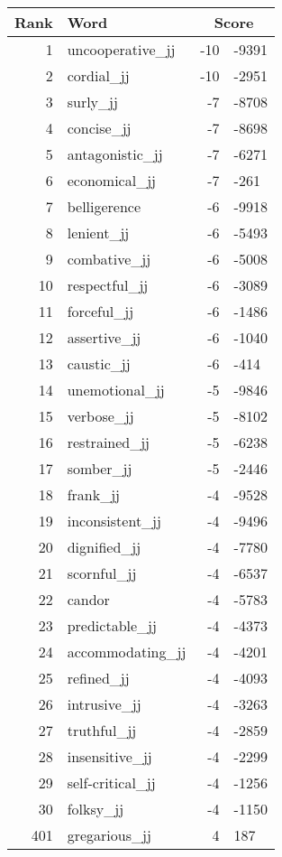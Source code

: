 \begin{longtable}[!htbp]{| rlr@{.}l |}
    \hline
    \textbf{Rank} & \textbf{Word} & \multicolumn{2}{c|}{\textbf{Score}} \\
    \hline
    \endhead
    1 & uncooperative\_jj & -10 & -9391 \\
    2 & cordial\_jj & -10 & -2951 \\
    3 & surly\_jj & -7 & -8708 \\
    4 & concise\_jj & -7 & -8698 \\
    5 & antagonistic\_jj & -7 & -6271 \\
    6 & economical\_jj & -7 & -261 \\
    7 & belligerence & -6 & -9918 \\
    8 & lenient\_jj & -6 & -5493 \\
    9 & combative\_jj & -6 & -5008 \\
    10 & respectful\_jj & -6 & -3089 \\
    11 & forceful\_jj & -6 & -1486 \\
    12 & assertive\_jj & -6 & -1040 \\
    13 & caustic\_jj & -6 & -414 \\
    14 & unemotional\_jj & -5 & -9846 \\
    15 & verbose\_jj & -5 & -8102 \\
    16 & restrained\_jj & -5 & -6238 \\
    17 & somber\_jj & -5 & -2446 \\
    18 & frank\_jj & -4 & -9528 \\
    19 & inconsistent\_jj & -4 & -9496 \\
    20 & dignified\_jj & -4 & -7780 \\
    21 & scornful\_jj & -4 & -6537 \\
    22 & candor & -4 & -5783 \\
    23 & predictable\_jj & -4 & -4373 \\
    24 & accommodating\_jj & -4 & -4201 \\
    25 & refined\_jj & -4 & -4093 \\
    26 & intrusive\_jj & -4 & -3263 \\
    27 & truthful\_jj & -4 & -2859 \\
    28 & insensitive\_jj & -4 & -2299 \\
    29 & self-critical\_jj & -4 & -1256 \\
    30 & folksy\_jj & -4 & -1150 \\
    401 & gregarious\_jj & 4 & 187 \\

\end{longtable}
